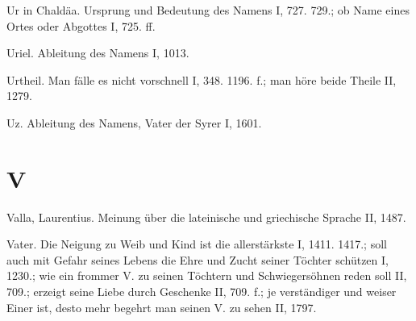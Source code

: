 Ur in Chaldäa. Ursprung und Bedeutung des Namens I, 727. 729.; ob Name eines Ortes oder Abgottes I, 725. ff.

Uriel. Ableitung des Namens I, 1013.

Urtheil. Man fälle es nicht vorschnell I, 348. 1196. f.; man höre beide Theile II, 1279.

Uz. Ableitung des Namens, Vater der Syrer I, 1601.

\section{V}

Valla, Laurentius. Meinung über die lateinische und griechische Sprache II, 1487.

Vater. Die Neigung zu Weib und Kind ist die allerstärkste I, 1411. 1417.; soll auch mit Gefahr seines Lebens die Ehre und Zucht seiner Töchter schützen I, 1230.; wie ein frommer V. zu seinen Töchtern und Schwiegersöhnen reden soll II, 709.; erzeigt seine Liebe durch Geschenke II, 709. f.; je verständiger und weiser Einer ist, desto mehr begehrt man seinen V. zu sehen II, 1797.

